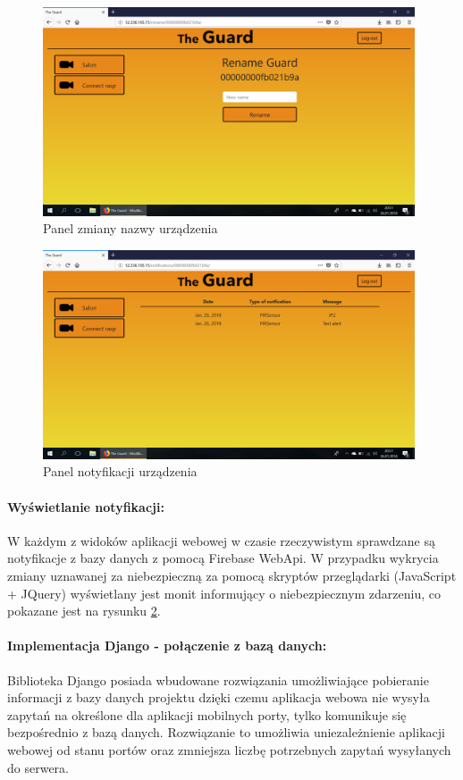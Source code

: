 \begin{figure}[ht]
	\centering
	\includegraphics[width=11cm]{web_screenshots/rasp_rename.png}
	\caption{Panel zmiany nazwy urządzenia}
	\label{web_rasp_rename}
\end{figure}

\begin{figure}[ht]
	\centering
	\includegraphics[width=11cm]{web_screenshots/rasp_notifications.png}
	\caption{Panel notyfikacji urządzenia}
	\label{web_rasp_notifications}
\end{figure}


\paragraph{Wyświetlanie notyfikacji:} W każdym z widoków aplikacji webowej w czasie rzeczywistym sprawdzane są notyfikacje z bazy danych z pomocą Firebase WebApi. W przypadku wykrycia zmiany uznawanej za niebezpieczną za pomocą skryptów przeglądarki (JavaScript + JQuery) wyświetlany jest monit informujący o niebezpiecznym zdarzeniu, co pokazane jest na rysunku \ref{web_rasp_notifications}.  


\paragraph{Implementacja Django - połączenie z bazą danych:}
Biblioteka Django posiada wbudowane rozwiązania umożliwiające pobieranie informacji z bazy danych projektu dzięki czemu aplikacja webowa nie wysyła zapytań na określone dla aplikacji mobilnych porty, tylko komunikuje się bezpośrednio z bazą danych. Rozwiązanie to umożliwia uniezależnienie aplikacji webowej od stanu portów oraz zmniejsza liczbę potrzebnych zapytań wysyłanych do serwera.
